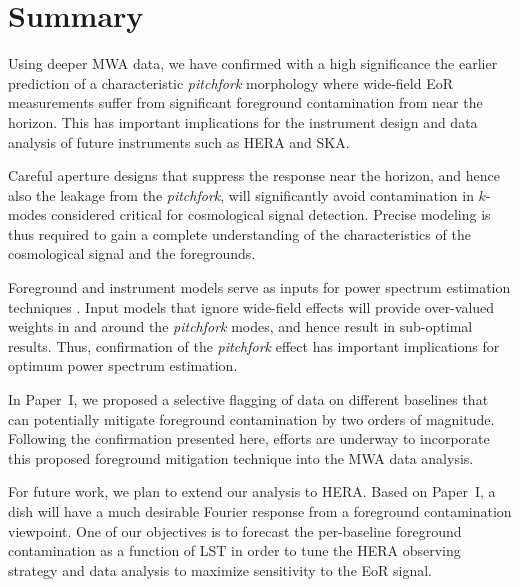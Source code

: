 \documentclass[preprint2,apjl,numberedappendix,twocolappendix,appendixfloats]{emulateapj}
\begin{document}
\section{Summary}\label{sec:summary}

Using deeper MWA data, we have confirmed with a high significance the earlier prediction of a characteristic {\it pitchfork} morphology where wide-field EoR measurements suffer from significant foreground contamination from near the horizon. This has important implications for the instrument design and data analysis of future instruments such as HERA and SKA. 

Careful aperture designs that suppress the response near the horizon, and hence also the leakage from the {\it pitchfork}, will significantly avoid contamination in $k$-modes considered critical for cosmological signal detection. Precise modeling is thus required to gain a complete understanding of the characteristics of the cosmological signal and the foregrounds. 

Foreground and instrument models serve as inputs for power spectrum estimation techniques \citep[see, e.g.,][]{liu14a,liu14b,dil15}. Input models that ignore wide-field effects will provide over-valued weights in and around the {\it pitchfork} modes, and hence result in sub-optimal results. Thus, confirmation of the {\it pitchfork} effect has important implications for optimum power spectrum estimation. 

In Paper~I, we proposed a selective flagging of data on different baselines that can potentially mitigate foreground contamination by two orders of magnitude. Following the confirmation presented here, efforts are underway to incorporate this proposed foreground mitigation technique into the MWA data analysis.

For future work, we plan to extend our analysis to HERA. Based on Paper~I, a dish will have a much desirable Fourier response from a foreground contamination viewpoint. One of our objectives is to forecast the per-baseline foreground contamination as a function of LST in order to tune the HERA observing strategy and data analysis to maximize sensitivity to the EoR signal.

\acknowledgments
\end{document}
